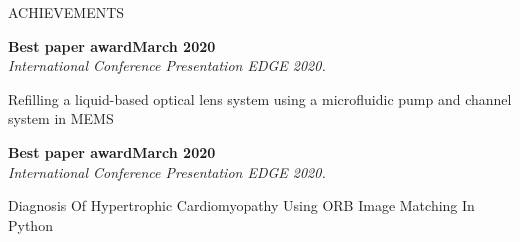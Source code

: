 \documentclass{resume} %
\begin{document}
\begin{rSection}{ACHIEVEMENTS}

\begin{rSubsectiond}{\textbf{Best paper award}}{\textbf{March 2020}\\\textit{International Conference Presentation EDGE 2020.}}
\item Refilling a liquid-based optical lens system using a microfluidic pump and channel system in MEMS
\end{rSubsectiond}
\begin{rSubsectiond}{\textbf{Best paper award}}{\textbf{March 2020}\\\textit{International Conference Presentation EDGE 2020.}}
\item Diagnosis Of Hypertrophic Cardiomyopathy Using ORB Image Matching In Python
\end{rSubsectiond}
\end{rSection}

\end{document}

